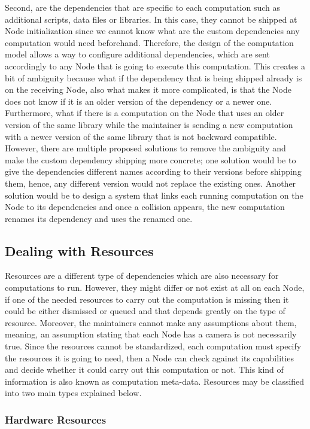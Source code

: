  Second, are the dependencies that are specific to each computation such as additional scripts, data files or libraries. In this case, they cannot be shipped at Node initialization since we cannot know what are the custom dependencies any computation would need beforehand. Therefore, the design of the computation model allows a way to configure additional dependencies, which are sent accordingly to any Node that is going to execute this computation.
  This creates a bit of ambiguity because what if the dependency that is being shipped  already is on the receiving Node, also what makes it more complicated, is that the Node does not know if it is an older version of the dependency or a newer one. Furthermore, what if there is a computation on the Node that uses an older version of the same library while the maintainer is sending a new computation with a newer version of the same library that is not backward compatible. However, there are multiple proposed solutions to remove the ambiguity and make the custom dependency shipping more concrete; one solution would be to give the dependencies different names according to their versions before shipping them, hence, any different version would not replace the existing ones. Another solution would be to design a system that links each running computation on the Node to its dependencies and once a collision appears, the new computation renames its dependency and uses the renamed one.
 
\newpage
\subsection{Dealing with Resources}
Resources are a different type of dependencies which are also necessary for computations to run. However, they might differ or not exist at all on each Node, if one of the needed resources to carry out the computation is missing then it could be either dismissed or queued and that depends greatly on the type of resource. Moreover, the maintainers cannot make any assumptions about them, meaning, an assumption stating that each Node has a camera is not necessarily true. Since the resources cannot be standardized, each computation must specify the resources it is going to need, then a Node can check against its capabilities and decide whether it could carry out this computation or not. This kind of information is also known as computation meta-data. Resources may be classified into two main types explained below.

\subsubsection{Hardware Resources}

